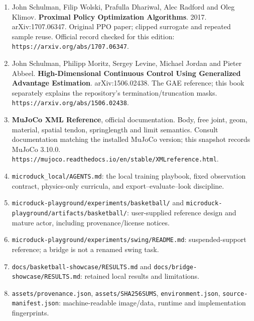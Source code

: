 \documentclass[
  american,
  11pt,
  letterpaper,
]{article}
\providecommand{\tightlist}{%
  \setlength{\itemsep}{0pt}\setlength{\parskip}{0pt}}
\begin{document}
\begin{enumerate}
\def\labelenumi{\arabic{enumi}.}
\tightlist
\item
  John Schulman, Filip Wolski, Prafulla Dhariwal, Alec Radford and Oleg
  Klimov. \textbf{Proximal Policy Optimization Algorithms}. 2017.
  arXiv:1707.06347. Original PPO paper; clipped surrogate and repeated
  sample reuse. Official record checked for this edition:
  \texttt{https://arxiv.org/abs/1707.06347}.
\item
  John Schulman, Philipp Moritz, Sergey Levine, Michael Jordan and
  Pieter Abbeel. \textbf{High-Dimensional Continuous Control Using
  Generalized Advantage Estimation}. arXiv:1506.02438. The GAE
  reference; this book separately explains the repository's
  termination/truncation masks.
  \texttt{https://arxiv.org/abs/1506.02438}.
\item
  \textbf{MuJoCo XML Reference}, official documentation. Body, free
  joint, geom, material, spatial tendon, springlength and limit
  semantics. Consult documentation matching the installed MuJoCo
  version; this snapshot records MuJoCo 3.10.0.
  \texttt{https://mujoco.readthedocs.io/en/stable/XMLreference.html}.
\item
  \texttt{microduc\allowbreak{}k\_\allowbreak{}local/\allowbreak{}AGENTS.m\allowbreak{}d}:
  the local training playbook, fixed observation contract, physics-only
  curricula, and export--evaluate--look discipline.
\item
  \texttt{microduc\allowbreak{}k-\allowbreak{}playgrou\allowbreak{}nd/\allowbreak{}experime\allowbreak{}nts/\allowbreak{}basketba\allowbreak{}ll/\allowbreak{}}
  and
  \texttt{microduc\allowbreak{}k-\allowbreak{}playgrou\allowbreak{}nd/\allowbreak{}artifact\allowbreak{}s/\allowbreak{}basketba\allowbreak{}ll/\allowbreak{}}:
  user-supplied reference design and mature actor, including
  provenance/license notices.
\item
  \texttt{microduc\allowbreak{}k-\allowbreak{}playgrou\allowbreak{}nd/\allowbreak{}experime\allowbreak{}nts/\allowbreak{}swing/\allowbreak{}README.m\allowbreak{}d}:
  suspended-support reference; a bridge is not a renamed swing task.
\item
  \texttt{docs/\allowbreak{}basketba\allowbreak{}ll-\allowbreak{}showcase\allowbreak{}/\allowbreak{}RESULTS.\allowbreak{}md}
  and
  \texttt{docs/\allowbreak{}bridge-\allowbreak{}showcase\allowbreak{}/\allowbreak{}RESULTS.\allowbreak{}md}:
  retained local results and limitations.
\item
  \texttt{assets/\allowbreak{}provenan\allowbreak{}ce.json},
  \texttt{assets/\allowbreak{}SHA256SU\allowbreak{}MS},
  \texttt{environm\allowbreak{}ent.json\allowbreak{}},
  \texttt{source-\allowbreak{}manifest\allowbreak{}.json}:
  machine-readable image/data, runtime and implementation fingerprints.
\end{enumerate}
\end{document}
